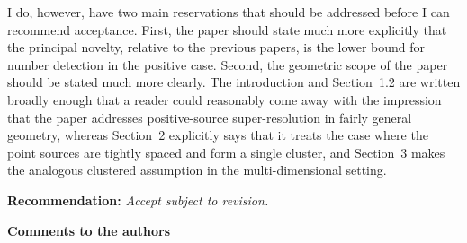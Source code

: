 \documentclass[11pt]{article}
\begin{document}
I do, however, have two main reservations that should be addressed before I can recommend
acceptance. First, the paper should state much more explicitly that the principal novelty,
relative to the previous papers, is the lower bound for number detection in the positive case.
Second, the geometric scope of the paper should be stated much more clearly. The introduction and
Section~1.2 are written broadly enough that a reader could reasonably come away with the
impression that the paper addresses positive-source super-resolution in fairly general geometry,
whereas Section~2 explicitly says that it treats the case where the point sources are tightly
spaced and form a single cluster, and Section~3 makes the analogous clustered assumption in the
multi-dimensional setting.

\textbf{Recommendation:} \emph{Accept subject to revision.}

\textbf{Comments to the authors}
\end{document}
